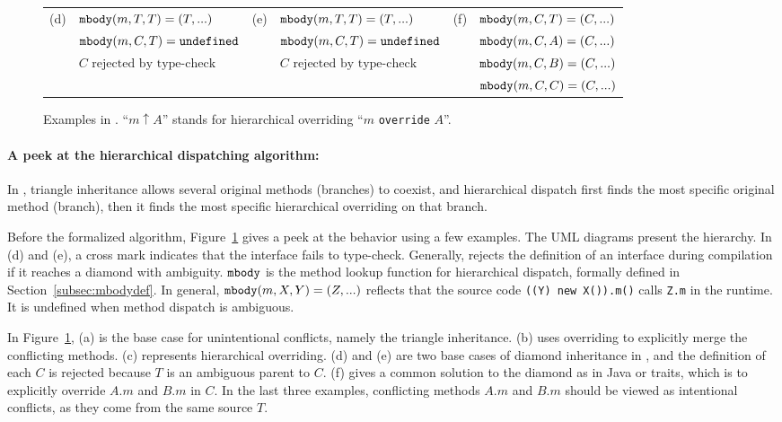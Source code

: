 \begin{figure}[t]
\begin{tabular}{clclcl}
		(d) & $\texttt{mbody}(m,T,T) = (T,...)$\ \ \  & (e) & $\texttt{mbody}(m,T,T) = (T,...)$\ \ \ & (f) & $\texttt{mbody}(m,C,T) = (C,...)$ \\
		& $\texttt{mbody}(m,C,T) = \texttt{undefined}$ & & $\texttt{mbody}(m,C,T) = \texttt{undefined}$ & & $\texttt{mbody}(m,C,A) = (C,...)$ \\
		& $C\text{ rejected by type-check}$ & & $C\text{ rejected by type-check}$ & & $\texttt{mbody}(m,C,B) = (C,...)$ \\
		& & & & & $\texttt{mbody}(m,C,C) = (C,...)$
	\end{tabular}
	\caption{Examples in \MIM{}. ``$m\uparrow A$'' stands for hierarchical overriding ``$m$ \lstinline|override| $A$''.}\label{fig:examplesmbody}
\end{figure}

\paragraph{A peek at the hierarchical dispatching algorithm:} In \MIM{}, triangle inheritance allows several original methods (branches)
to coexist, and hierarchical dispatch first finds the most specific
original method (branch), then it finds the most specific hierarchical
overriding on that branch.

Before the formalized algorithm, Figure~\ref{fig:examplesmbody} gives
a peek at the behavior 
using a few examples. The UML diagrams present the hierarchy. 
In (d) and (e), a cross mark indicates that the interface fails to type-check. Generally, \MIM{} rejects the definition of an interface
during compilation if it reaches a diamond with ambiguity. $\texttt{mbody}$ is the method lookup function for hierarchical
dispatch, formally defined in Section~\ref{subsec:mbodydef}. In general, $\texttt{mbody}(m, X, Y) = (Z, ...)$ reflects that the source code \lstinline|((Y) new X()).m()| calls \lstinline|Z.m| in the runtime. It is undefined when method dispatch is ambiguous.

In  Figure~\ref{fig:examplesmbody}, (a) is the base case for unintentional conflicts, namely the triangle inheritance. (b) uses overriding to explicitly merge the conflicting methods. (c) represents hierarchical overriding. (d) and (e) are two base cases of diamond inheritance in \MIM{}, and the definition of each $C$ is rejected because $T$ is an ambiguous parent to $C$. (f) gives a common solution to the diamond as in Java or traits, which is to explicitly override $A.m$ and $B.m$ in $C$. In the last three examples, conflicting methods $A.m$ and $B.m$ should be viewed as
intentional conflicts, as they come from the same source $T$.
